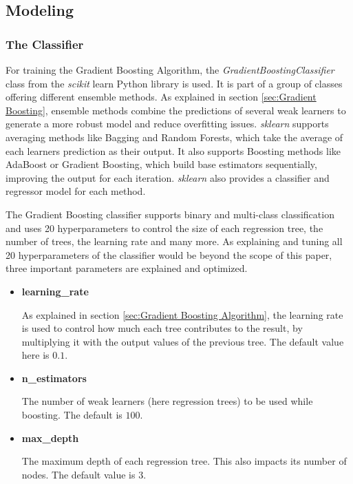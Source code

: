 \subsection{Modeling}
\label{sec:Modeling}

\subsubsection{The Classifier}

For training the Gradient Boosting Algorithm, the \emph{GradientBoostingClassifier} class from 
the \emph{scikit} learn Python library is used. It is part of a group of classes offering different ensemble methods.
As explained in section \ref{sec:Gradient Boosting}, ensemble methods combine the predictions of several
weak learners to generate a more robust model and reduce overfitting issues.
\emph{sklearn} supports averaging methods like Bagging and Random Forests, which take the average of each learners prediction
as their output. It also supports Boosting methods like AdaBoost or Gradient Boosting, which
build base estimators sequentially, improving the output for each iteration.
\emph{sklearn} also provides a classifier and regressor model for each method.

The Gradient Boosting classifier supports binary and multi-class classification and uses
20 hyperparameters to control the size of each regression tree, the number of trees,
the learning rate and many more.
As explaining and tuning all 20 hyperparameters of the classifier would be beyond the scope of this
paper, three important parameters are explained and optimized.

\begin{itemize}
    \item \textbf{learning\_rate}
    
    As explained in section \ref{sec:Gradient Boosting Algorithm}, the learning rate is used to control how
    much each tree contributes to the result, by multiplying it with the output values of the previous 
    tree. The default value here is $0.1$.
    \item \textbf{n\_estimators}

    The number of weak learners (here regression trees) to be used while boosting. The default is $100$.
    \item \textbf{max\_depth}

    The maximum depth of each regression tree. This also impacts its number of nodes.
    The default value is $3$.
\end{itemize}

